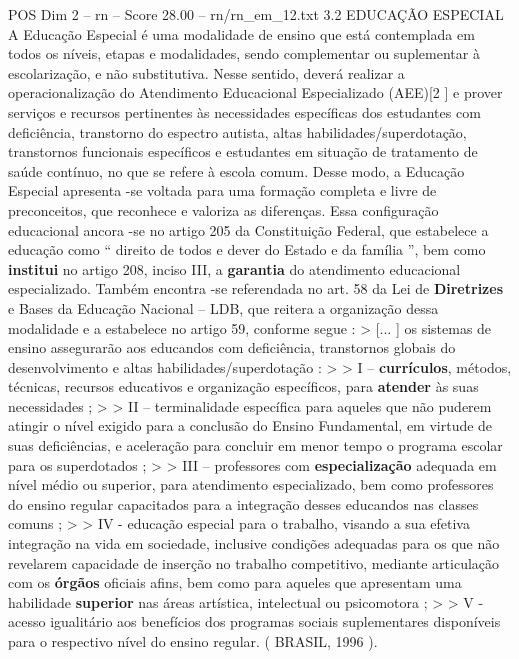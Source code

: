 \begin{textsample}{POS Dim 2 – rn – Score 28.00 – rn/rn\_em\_12.txt}  \label{ex:f2_pos_242}
3.2 EDUCAÇÃO ESPECIAL A Educação Especial é uma modalidade de ensino que está contemplada em todos os níveis, etapas e modalidades, sendo complementar ou suplementar à escolarização, e não substitutiva.
Nesse sentido, deverá realizar a operacionalização do Atendimento Educacional Especializado (AEE)[2 ] e prover serviços e recursos pertinentes às necessidades específicas dos estudantes com deficiência, transtorno do espectro autista, altas habilidades/superdotação, transtornos funcionais específicos e estudantes em situação de tratamento de saúde contínuo, no que se refere à escola comum.
Desse modo, a Educação Especial apresenta -se voltada para uma formação completa e livre de preconceitos, que reconhece e valoriza as diferenças.
Essa configuração educacional ancora -se no artigo 205 da Constituição Federal, que estabelece a educação como “ direito de todos e dever do Estado e da família ”, bem como \textbf{institui} no artigo 208, inciso III, a \textbf{garantia} do atendimento educacional especializado.
Também encontra -se referendada no art. 58 da Lei de \textbf{Diretrizes} e Bases da Educação Nacional – LDB, que reitera a organização dessa modalidade e a estabelece no artigo 59, conforme segue : > [... ] os sistemas de ensino assegurarão aos educandos com deficiência, transtornos globais do desenvolvimento e altas habilidades/superdotação : > > I – \textbf{currículos}, métodos, técnicas, recursos educativos e organização específicos, para \textbf{atender} às suas necessidades ; > > II – terminalidade específica para aqueles que não puderem atingir o nível exigido para a conclusão do Ensino Fundamental, em virtude de suas deficiências, e aceleração para concluir em menor tempo o programa escolar para os superdotados ; > > III – professores com \textbf{especialização} adequada em nível médio ou superior, para atendimento especializado, bem como professores do ensino regular capacitados para a integração desses educandos nas classes comuns ; > > IV - educação especial para o trabalho, visando a sua efetiva integração na vida em sociedade, inclusive condições adequadas para os que não revelarem capacidade de inserção no trabalho competitivo, mediante articulação com os \textbf{órgãos} oficiais afins, bem como para aqueles que apresentam uma habilidade \textbf{superior} nas áreas artística, intelectual ou psicomotora ; > > V - acesso igualitário aos benefícios dos programas sociais suplementares disponíveis para o respectivo nível do ensino regular. ( BRASIL, 1996 ).

\end{textsample}
